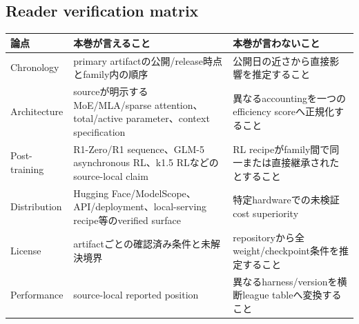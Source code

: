 \documentclass[lualatex,a4paper,10pt]{jlreq}
\begin{document}
\subsection*{Reader verification matrix}
\small
\begin{tabularx}{\textwidth}{@{}p{}p{}X@{}}
\toprule
論点 & 本巻が言えること & 本巻が言わないこと \\
\midrule
Chronology & primary artifactの公開/release時点とfamily内の順序 & 公開日の近さから直接影響を推定すること \\
Architecture & sourceが明示するMoE/MLA/sparse attention、total/active parameter、context specification & 異なるaccountingを一つのefficiency scoreへ正規化すること \\
Post-training & R1-Zero/R1 sequence、GLM-5 asynchronous RL、k1.5 RLなどのsource-local claim & RL recipeがfamily間で同一または直接継承されたとすること \\
Distribution & Hugging Face/ModelScope、API/deployment、local-serving recipe等のverified surface & 特定hardwareでの未検証cost superiority \\
License & artifactごとの確認済み条件と未解決境界 & repositoryから全weight/checkpoint条件を推定すること \\
Performance & source-local reported position & 異なるharness/versionを横断league tableへ変換すること \\
\bottomrule
\end{tabularx}
\normalsize

\renewcommand*{\bibfont}{\footnotesize}
\setlength{\bibitemsep}{0.15\baselineskip}
\printbibliography[title={References / Source Notes}]
\end{document}

